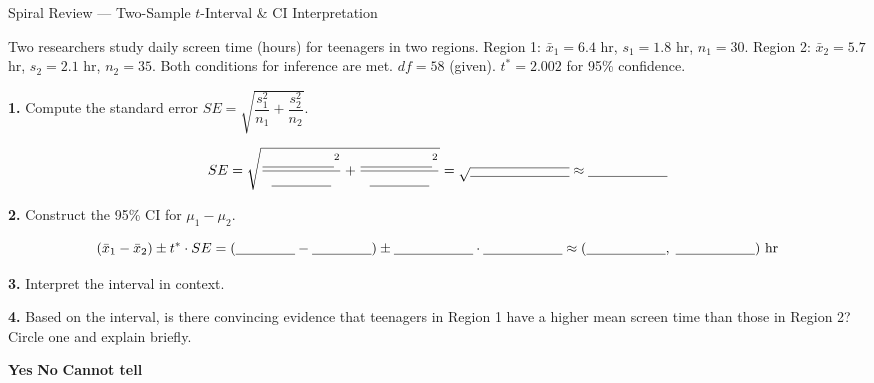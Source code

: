 \documentclass[10pt]{article}
\begin{document}
\namedateperiod

\vspace{0.15in}

\begin{notesbox}{Spiral Review --- Two-Sample $t$-Interval \& CI Interpretation}

Two researchers study daily screen time (hours) for teenagers in two regions.
Region 1: $\bar x_1 = 6.4$ hr, $s_1 = 1.8$ hr, $n_1 = 30$.
Region 2: $\bar x_2 = 5.7$ hr, $s_2 = 2.1$ hr, $n_2 = 35$.
Both conditions for inference are met. $df = 58$ (given). $t^* = 2.002$ for 95\% confidence.

\medskip
\textbf{1.} Compute the standard error $SE = \sqrt{\dfrac{s_1^2}{n_1} + \dfrac{s_2^2}{n_2}}$.

\[SE = \sqrt{\dfrac{\blank{1.8cm}^2}{\blank{1.5cm}} + \dfrac{\blank{1.8cm}^2}{\blank{1.5cm}}} = \sqrt{\blank{2.5cm}} \approx \blank{2cm}\]

\medskip
\textbf{2.} Construct the 95\% CI for $\mu_1 - \mu_2$.

\[(\bar x_1 - \bar x_2) \pm t^* \cdot SE = (\blank{1.5cm} - \blank{1.5cm}) \pm \blank{2cm} \cdot \blank{2cm} \approx (\blank{2cm},\; \blank{2cm})\text{ hr}\]

\medskip
\textbf{3.} Interpret the interval in context.


\medskip
\textbf{4.} Based on the interval, is there convincing evidence that teenagers in Region 1
have a higher mean screen time than those in Region 2? Circle one and explain briefly.

\quad \textbf{Yes} \qquad \textbf{No} \qquad \textbf{Cannot tell}

\writeline

\end{notesbox}
\end{document}
